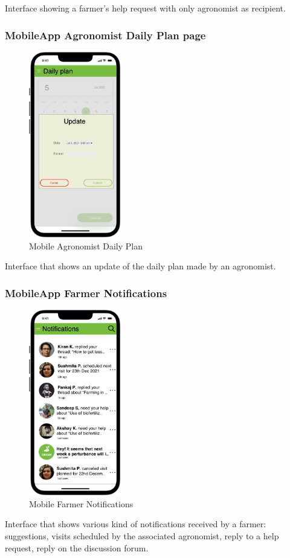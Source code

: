 Interface showing a farmer's help request with only agronomist as recipient.

\subsubsection{MobileApp Agronomist Daily Plan page}

\begin{figure}[H]
     \centering
       \vspace*{-0.3cm}
     \includegraphics[width=40mm,scale=0.9]{./Images//Mocks/Mobile/Agronomist_daily_plan.png}
     \vspace*{-0.3cm}
     \caption{Mobile Agronomist Daily Plan}
\end{figure}

Interface that shows an update of the daily plan made by an agronomist.

\subsubsection{MobileApp Farmer Notifications}

\begin{figure}[H]
  \centering
    \vspace*{-0.3cm}
     \includegraphics[width=40mm,scale=0.9]{./Images//Mocks/Mobile/Farmer_notif.png}
     \vspace*{-0.3cm}
     \caption{Mobile Farmer Notifications}
\end{figure}

Interface that shows various kind of notifications received by a farmer: suggestions, visits scheduled by the associated agronomist, reply to a help request, reply on the discussion forum.
\newpage